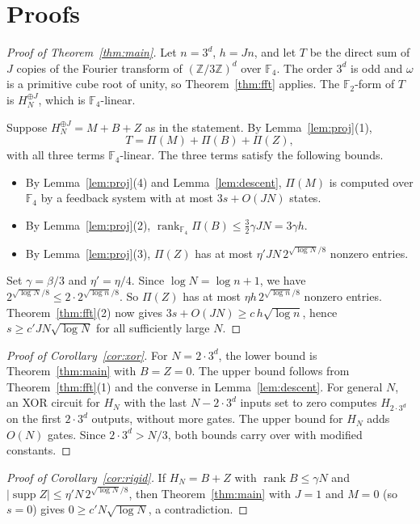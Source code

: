 \documentclass[11pt]{article}
\theoremstyle{definition}
\theoremstyle{remark}
\newcommand{\F}{\mathbb{F}}
\newcommand{\Z}{\mathbb{Z}}
\newcommand{\supp}{\operatorname{supp}}
\newcommand{\rk}{\operatorname{rank}}
\begin{document}
\section{Proofs}
\begin{proof}[Proof of Theorem~\ref{thm:main}]
Let $n=3^d$, $h=Jn$, and let $T$ be the direct sum of $J$ copies of the
Fourier transform of $(\Z/3\Z)^d$ over $\F_4$. The order $3^d$ is odd and
$\omega$ is a primitive cube root of unity, so Theorem~\ref{thm:fft}
applies. The $\F_2$-form of $T$ is $H_N^{\oplus J}$, which is $\F_4$-linear.

Suppose $H_N^{\oplus J}=M+B+Z$ as in the statement. By
Lemma~\ref{lem:proj}(1),
\[
T=\Pi(M)+\Pi(B)+\Pi(Z),
\]
with all three terms $\F_4$-linear. The three terms satisfy the following
bounds.
\begin{itemize}
\item By Lemma~\ref{lem:proj}(4) and Lemma~\ref{lem:descent}, $\Pi(M)$ is
computed over $\F_4$ by a feedback system with at most $3s+O(JN)$ states.
\item By Lemma~\ref{lem:proj}(2),
$\rk_{\F_4}\Pi(B)\le\tfrac32\gamma JN=3\gamma h$.
\item By Lemma~\ref{lem:proj}(3), $\Pi(Z)$ has at most
$\eta'JN\,2^{\sqrt{\log N}/8}$ nonzero entries.
\end{itemize}
Set $\gamma=\beta/3$ and $\eta'=\eta/4$. Since $\log N=\log n+1$, we have
$2^{\sqrt{\log N}/8}\le2\cdot2^{\sqrt{\log n}/8}$. So $\Pi(Z)$ has at most
$\eta h\,2^{\sqrt{\log n}/8}$ nonzero entries. Theorem~\ref{thm:fft}(2) now
gives $3s+O(JN)\ge c\,h\sqrt{\log n}$, hence $s\ge c'JN\sqrt{\log N}$ for
all sufficiently large $N$.
\end{proof}

\begin{proof}[Proof of Corollary~\ref{cor:xor}]
For $N=2\cdot3^d$, the lower bound is Theorem~\ref{thm:main} with $B=Z=0$.
The upper bound follows from Theorem~\ref{thm:fft}(1) and the converse in
Lemma~\ref{lem:descent}. For general $N$, an XOR circuit for $H_N$ with
the last $N-2\cdot3^d$ inputs set to zero computes $H_{2\cdot3^d}$ on the
first $2\cdot3^d$ outputs, without more gates. The upper bound for $H_N$
adds $O(N)$ gates. Since $2\cdot3^d>N/3$, both bounds carry over with
modified constants.
\end{proof}

\begin{proof}[Proof of Corollary~\ref{cor:rigid}]
If $H_N=B+Z$ with $\rk B\le\gamma N$ and
$|\supp Z|\le\eta'N\,2^{\sqrt{\log N}/8}$, then Theorem~\ref{thm:main} with
$J=1$ and $M=0$ (so $s=0$) gives $0\ge c'N\sqrt{\log N}$, a contradiction.
\end{proof}
\end{document}
